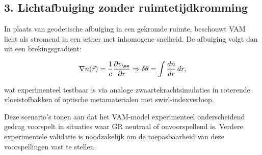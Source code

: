 \subsection*{3. Lichtafbuiging zonder ruimtetijdkromming}

In plaats van geodetische afbuiging in een gekromde ruimte, beschouwt VAM licht als stromend in een æther met inhomogene snelheid. De afbuiging volgt dan uit een brekingsgradiënt:

\begin{equation}
    \nabla n(\vec{r}) = \frac{1}{c} \frac{\partial v_{\ae}}{\partial r} \Rightarrow \delta \theta = \int \frac{dn}{dr} \, dr,\label{eq:light_bending}
\end{equation}

wat experimenteel testbaar is via analoge zwaartekrachtsimulaties in roterende vloeistofbakken of optische metamaterialen met swirl-indexverloop.

\bigskip

Deze scenario’s tonen aan dat het VAM-model experimenteel onderscheidend gedrag voorspelt in situaties waar GR neutraal of onvoorspellend is. Verdere experimentele validatie is noodzakelijk om de toepasbaarheid van deze voorspellingen vast te stellen.